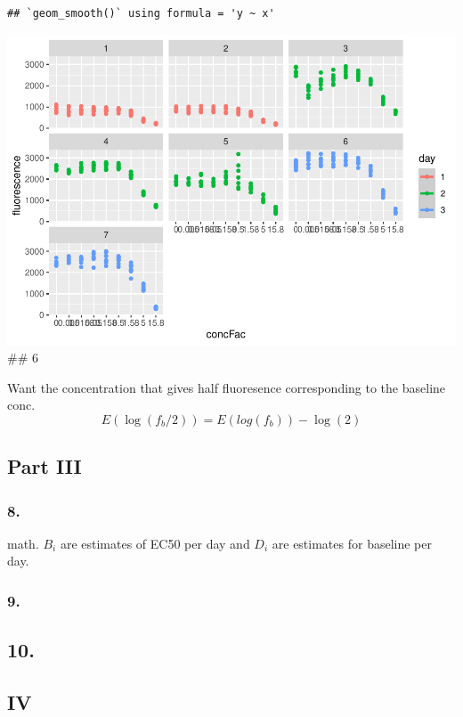 \documentclass[
]{article}
\begin{document}
\begin{verbatim}
## `geom_smooth()` using formula = 'y ~ x'
\end{verbatim}

\includegraphics{for_markdown_files/figure-latex/unnamed-chunk-8-1.pdf}
\#\# 6

Want the concentration that gives half fluoresence corresponding to the
baseline conc. \[
E(\log(f_b/2)) = E(log(f_b))-\log(2)   
\]

\hypertarget{part-iii}{%
\subsection{Part III}\label{part-iii}}

\hypertarget{section-4}{%
\subsubsection{8.}\label{section-4}}

math. \(B_i\) are estimates of EC50 per day and \(D_i\) are estimates
for baseline per day.

\hypertarget{section-5}{%
\subsubsection{9.}\label{section-5}}

\hypertarget{section-6}{%
\subsection{10.}\label{section-6}}

\hypertarget{iv}{%
\subsection{IV}\label{iv}}
\end{document}
